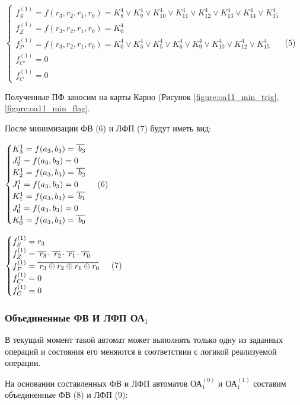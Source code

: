 $
\begin{cases}
f^{(1)}_{S} = f(r_3, r_2, r_1, r_0) = K^4_8 \vee K^4_9 \vee K^4_10 \vee K^4_11 \vee K^4_12 \vee K^4_13 \vee K^4_14 \vee K^4_15
\\
f^{(1)}_{Z} = f(r_3, r_2, r_1, r_0) = K^4_0
\\
f^{(1)}_{P} = f(r_3, r_2, r_1, r_0) = K^4_0 \vee K^4_3 \vee K^4_5 \vee K^4_6 \vee K^4_9 \vee K^4_10 \vee K^4_12 \vee K^4_15
\\
f^{(1)}_{C'}= 0
\\
f^{(1)}_{C} = 0
\end{cases}
$ (5)

Полученные ПФ заносим на карты Карно (Рисунок \ref{figure:oa11_min_trig}, \ref{figure:oa11_min_flag}.



После минимизации ФВ (6) и ЛФП (7) будут иметь вид:

$
\begin{cases}
K^1_3 = f(a_3, b_3) = \oline{b_3}
\\
J^1_2 = f(a_3, b_3) = 0
\\
K^1_2 = f(a_3, b_3) = \oline{b_2}
\\
J^1_1 = f(a_3, b_3) = 0
\\
K^1_1 = f(a_3, b_3) = \oline{b_1}
\\
J^1_0 = f(a_3, b_3) = 0
\\
K^1_0 = f(a_3, b_3) = \oline{b_0}
\end{cases}
$ (6)

$
\begin{cases}
f^{(1)}_{S} = r_3
\\
f^{(1)}_{Z} = \oline{r_3} \cdot \oline{r_2} \cdot \oline{r_1} \cdot \oline{r_0}
\\
f^{(1)}_{P} = \oline{r_3 \oplus r_2 \oplus r_1 \oplus r_0}
\\
f^{(1)}_{C'}= 0
\\
f^{(1)}_{C} = 0
\end{cases}
$ (7)


\subsubsection{Объединенные ФВ И ЛФП ОА${}_1$}

В текущий момент такой автомат может выполнять только одну из заданных операций и состояния его меняются в соответствии с логикой реализуемой операции.

На основании составленных ФВ и ЛФП автоматов ОА$^{(0)}_{1}$ и ОА$^{(1)}_{1}$ составим объединенные ФВ (8) и ЛФП (9):

